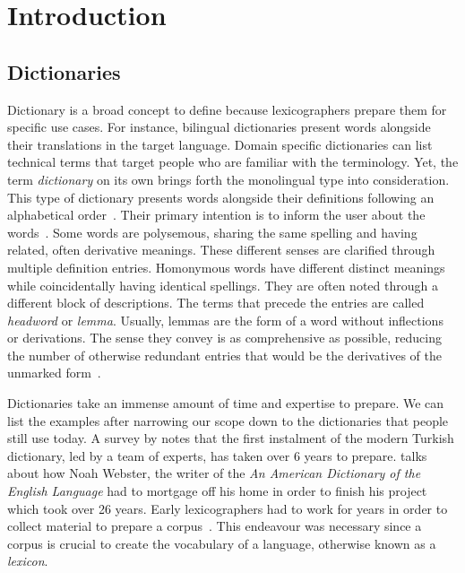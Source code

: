 \chapter{Introduction}\label{chap:introduction}%
\section{Dictionaries}%
\label{sec:dictionaries}
Dictionary is a broad concept to define because lexicographers prepare them for specific use cases.
For instance, bilingual dictionaries present words alongside their translations in the target language.
Domain specific dictionaries can list technical terms that target people who are familiar with the terminology.
Yet, the term \emph{dictionary} on its own brings forth the monolingual type into consideration.
This type of dictionary presents words alongside their definitions following an alphabetical order~\cite{sterkenburg_practical_2003}.
Their primary intention is to inform the user about the words~\cite{uzun_modern_2005}.
Some words are polysemous, sharing the same spelling and having related, often derivative meanings.
These different senses are clarified through multiple definition entries.
Homonymous words have different distinct meanings while coincidentally having identical spellings.
They are often noted through a different block of descriptions.
The terms that precede the entries are called \emph{headword} or \emph{lemma}.
Usually, lemmas are the form of a word without inflections or derivations.
The sense they convey is as comprehensive as possible, reducing the number of otherwise redundant entries that would be the derivatives of the unmarked form~\cite{ibrahim_usta_turkce_2006}.

Dictionaries take an immense amount of time and expertise to prepare.
We can list the examples after narrowing our scope down to the dictionaries that people still use today.
A survey by \textcite{uzun_1945ten_1999} notes that the first instalment of the modern Turkish dictionary, led by a team of experts, has taken over 6 years to prepare.
\textcite{kendall_forgotten_2011} talks about how Noah Webster, the writer of the \emph{An American Dictionary of the English Language} had to mortgage off his home in order to finish his project which took over 26 years.
Early lexicographers had to work for years in order to collect material to prepare a corpus~\cite{uzun_1945ten_1999}.
This endeavour was necessary since a corpus is crucial to create the vocabulary of a language, otherwise known as a \emph{lexicon}.

